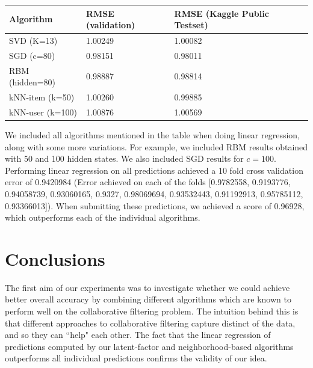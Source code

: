 \documentclass[10pt,conference,compsocconf]{IEEEtran}
\begin{document}
	\begin{center}
		\begin{tabular}{ |p{2.8cm}||p{2.4cm}|p{2.3cm}|  }
			\hline
			Algorithm & RMSE (validation) & RMSE (Kaggle Public Testset) \\ [0.5ex] 
			\hline\hline
			SVD (K=13) & 1.00249 & 1.00082 \\ 
			\hline
			SGD (c=80) & 0.98151
			 &  0.98011 \\
			\hline
			RBM (hidden=80) & 0.98887 & 0.98814 \\
			\hline
			kNN-item (k=50) & 1.00260 & 0.99885 \\ 
			\hline
			kNN-user (k=100) & 1.00876 & 1.00569 \\ [1ex] 
			\hline
		\end{tabular}
	\end{center}
	
	We included all algorithms mentioned in the table when doing linear regression, along with some more variations. For example, we included RBM results obtained with 50 and 100 hidden states. We also included SGD results for $c = 100$. Performing linear regression on all predictions achieved a 10 fold cross validation error of 0.9420984 (Error achieved on each of the folds [0.9782558, 0.9193776, 0.94058739, 0.93060165, 0.9327, 0.98069694, 0.93532443, 0.91192913, 0.95785112, 0.93366013]). When submitting these predictions, we achieved a score of 0.96928, which outperforms each of the individual algorithms.
	
	\section{Conclusions}
	\label{sec:conclusions}
	
	The first aim of our experiments was to investigate whether we could achieve better overall accuracy by combining different algorithms which are known to perform well on the collaborative filtering problem. The intuition behind this is that different approaches to collaborative filtering capture distinct of the data, and so they can ``help" each other. The fact that the linear regression of predictions computed by our latent-factor and neighborhood-based algorithms outperforms all individual predictions confirms the validity of our idea.
	
\end{document}
